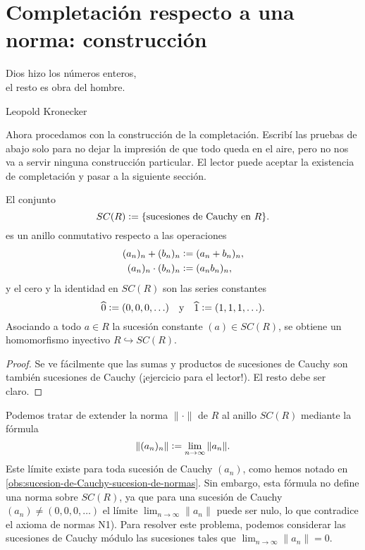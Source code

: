 \documentclass{article}
\numberwithin{equation}{section}
\theoremstyle{definition}
\begin{document}

\section{Completación respecto a una norma: construcción}

\epigraph{Dios hizo los números enteros,\\
el resto es obra del hombre.}{Leopold Kronecker}

Ahora procedamos con la construcción de la completación. Escribí las pruebas
de abajo solo para no dejar la impresión de que todo queda en el aire, pero no
nos va a servir ninguna construcción particular. El lector puede aceptar la
existencia de completación y pasar a la siguiente sección.

\begin{lema}
  El conjunto
  $$SC (R) \mathrel{\mathop:}= \{ \text{sucesiones de Cauchy en }R \}.$$
  es un anillo conmutativo respecto a las operaciones
  \begin{align*}
    (a_n)_n + (b_n)_n & \mathrel{\mathop:}= (a_n + b_n)_n,\\
    (a_n)_n \cdot (b_n)_n & \mathrel{\mathop:}= (a_n b_n)_n,
  \end{align*}
  y el cero y la identidad en $SC (R)$ son las series constantes
  \[ \widehat{0} \mathrel{\mathop:}= (0,0,0,\ldots)
     \quad\text{y}\quad
     \widehat{1} \mathrel{\mathop:}= (1,1,1,\ldots). \]
  Asociando a todo $a\in R$ la sucesión constante $(a) \in SC (R)$, se obtiene
  un homomorfismo inyectivo $R \hookrightarrow SC (R)$.

  \begin{proof}
    Se ve fácilmente que las sumas y productos de sucesiones de Cauchy son
    también sucesiones de Cauchy (¡ejercicio para el lector!). El resto debe ser
    claro.
  \end{proof}
\end{lema}

Podemos tratar de extender la norma $\|\cdot\|$ de $R$ al anillo $SC (R)$
mediante la fórmula
$$\|(a_n)_n\| \mathrel{\mathop:}= \lim_{n\to\infty} \|a_n\|.$$
Este límite existe para toda sucesión de Cauchy $(a_n)$, como hemos notado en
\ref{obs:sucesion-de-Cauchy-sucesion-de-normas}. Sin embargo, esta fórmula
no define una norma sobre $SC (R)$, ya que para una sucesión de Cauchy
$(a_n) \ne (0,0,0,\ldots)$ el límite $\lim_{n\to\infty} \|a_n\|$ puede ser nulo,
lo que contradice el axioma de normas N1). Para resolver este problema, podemos
considerar las sucesiones de Cauchy módulo las sucesiones tales que
$\lim_{n\to\infty} \|a_n\| = 0$.
\end{document}
